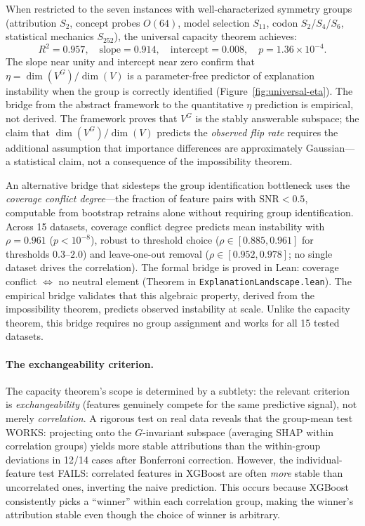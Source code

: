 \documentclass[11pt,a4paper]{article}
\begin{document}
When restricted to the seven instances with well-characterized symmetry groups
(attribution $S_2$, concept probes $O(64)$, model selection $S_{11}$, codon
$S_2$/$S_4$/$S_6$, statistical mechanics $S_{252}$), the universal capacity theorem
achieves:
\begin{equation}
  R^2 = 0.957, \quad \text{slope} = 0.914, \quad \text{intercept} = 0.008,
  \quad p = 1.36 \times 10^{-4}.
  \label{eq:eta-well-characterized}
\end{equation}
The slope near unity and intercept near zero confirm that
$\eta = \dim(V^G)/\dim(V)$ is a parameter-free predictor of explanation
instability when the group is correctly identified
(Figure~\ref{fig:universal-eta}).
The bridge from the abstract framework to the quantitative $\eta$ prediction is empirical, not derived.  The framework proves that $V^G$ is the stably answerable subspace; the claim that $\dim(V^G)/\dim(V)$ predicts the \emph{observed flip rate} requires the additional assumption that importance differences are approximately Gaussian---a statistical claim, not a consequence of the impossibility theorem.

An alternative bridge that sidesteps the group identification bottleneck uses the \emph{coverage conflict degree}---the fraction of feature pairs with $\text{SNR} < 0.5$, computable from bootstrap retrains alone without requiring group identification.  Across 15 datasets, coverage conflict degree predicts mean instability with $\rho = 0.961$ ($p < 10^{-8}$), robust to threshold choice ($\rho \in [0.885, 0.961]$ for thresholds $0.3$--$2.0$) and leave-one-out removal ($\rho \in [0.952, 0.978]$; no single dataset drives the correlation).  The formal bridge is proved in Lean: coverage conflict $\Leftrightarrow$ no neutral element (Theorem in \texttt{ExplanationLandscape.lean}).  The empirical bridge validates that this algebraic property, derived from the impossibility theorem, predicts observed instability at scale.  Unlike the capacity theorem, this bridge requires no group assignment and works for all 15 tested datasets.

\paragraph{The exchangeability criterion.}
The capacity theorem's scope is determined by a subtlety: the relevant criterion is \emph{exchangeability} (features genuinely compete for the same predictive signal), not merely \emph{correlation}.  A rigorous test on real data reveals that the group-mean test WORKS: projecting onto the $G$-invariant subspace (averaging SHAP within correlation groups) yields more stable attributions than the within-group deviations in 12/14 cases after Bonferroni correction.  However, the individual-feature test FAILS: correlated features in XGBoost are often \emph{more} stable than uncorrelated ones, inverting the naive prediction.  This occurs because XGBoost consistently picks a ``winner'' within each correlation group, making the winner's attribution stable even though the choice of winner is arbitrary.
\end{document}
